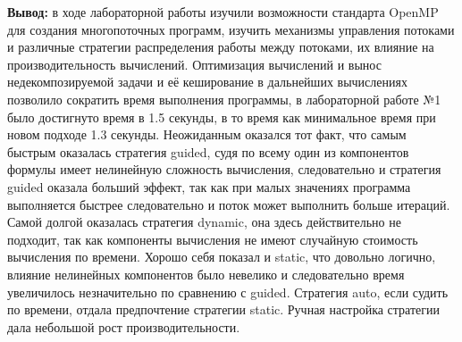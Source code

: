 \documentclass[a4paper,14pt]{extarticle}
\begin{document}
\textbf{Вывод: } в ходе лабораторной работы изучили возможности стандарта OpenMP для создания многопоточных
программ, изучить механизмы управления потоками и различные стратегии распределения
работы между потоками, их влияние на производительность вычислений. Оптимизация вычислений и вынос
недекомпозируемой задачи и её кеширование в дальнейших вычислениях позволило сократить время выполнения программы, 
в лабораторной работе №1 было достигнуто время в 1.5 секунды, в то время как минимальное время при новом подходе
1.3 секунды. Неожиданным оказался тот факт, что самым быстрым оказалась стратегия guided, судя по всему один из компонентов
формулы имеет нелинейную сложность вычисления, следовательно и стратегия guided оказала больший эффект, так как 
при малых значениях программа выполняется быстрее следовательно и поток может выполнить больше итераций. 
Самой долгой оказалась стратегия dynamic, она здесь действительно не подходит, так как компоненты вычисления
не имеют случайную стоимость вычисления по времени. Хорошо себя показал и static, что довольно логично, 
влияние нелинейных компонентов было невелико и следовательно время увеличилось незначительно по сравнению с 
guided. Стратегия auto, если судить по времени, отдала предпочтение стратегии static. Ручная настройка 
стратегии дала небольшой рост производительности.
\end{document}
